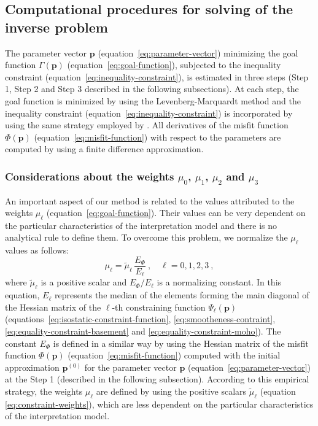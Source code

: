 \documentclass[manuscript]{geophysics}
\begin{document}
\subsection{Computational procedures for solving of the inverse problem}

The parameter vector $\mathbf{p}$ (equation~\ref{eq:parameter-vector}) minimizing the
goal function $\Gamma (\mathbf{p})$ (equation~\ref{eq:goal-function}), subjected to
the inequality constraint (equation~\ref{eq:inequality-constraint}), is estimated 
in three steps (Step 1, Step 2 and Step 3 described in the following subsections). 
At each step, the goal function is minimized by using the Levenberg-Marquardt 
method \citep{silva-etal2001, aster-etal2005} and the inequality constraint 
(equation~\ref{eq:inequality-constraint}) is incorporated by using the same strategy 
employed by \citet{barbosa-etal1999}.
All derivatives of the misfit function $\Phi(\mathbf{p})$ (equation~\ref{eq:misfit-function})
with respect to the parameters are computed by using a finite difference approximation.

\subsubsection{Considerations about the weights $\mu_{0}$, $\mu_{1}$, $\mu_{2}$ and $\mu_{3}$}

An important aspect of our method is related to the values attributed to 
the weights $\mu_{\ell}$ (equation~\ref{eq:goal-function}).
Their values can be very dependent on the particular characteristics of the 
interpretation model and there is no analytical rule to define them. 
To overcome this problem, we normalize the $\mu_{\ell}$ values as follows:
\begin{equation}
	\mu_{\ell} = \tilde{\mu}_{\ell} \, \frac{E_{\Phi}}{E_{\ell}} \: 
	, \quad \ell = 0, 1, 2, 3 \: ,
	\label{eq:constraint-weights}
\end{equation}
where $\tilde{\mu}_{\ell}$ is a positive scalar and $E_{\Phi} / E_{\ell}$
is a normalizing constant. In this equation, $E_{\ell}$ represents the median 
of the elements forming the main diagonal of the Hessian matrix of the 
$\ell$-th constraining function $\Psi_{\ell}(\mathbf{p})$ 
(equations~\ref{eq:isostatic-constraint-function}, 
\ref{eq:smootheness-contraint}, \ref{eq:equality-constraint-basement} and 
\ref{eq:equality-constraint-moho}). The constant $E_{\Phi}$ is defined in 
a similar way by using the Hessian matrix of the misfit function $\Phi(\mathbf{p})$ 
(equation~\ref{eq:misfit-function}) computed with 
the initial approximation $\mathbf{p}^{(0)}$ for the parameter vector $\mathbf{p}$ 
(equation~\ref{eq:parameter-vector}) at the Step 1 (described in the following subsection).
According to this empirical strategy, the weights $\mu_{\ell}$ are defined 
by using the positive scalars $\tilde{\mu}_{\ell}$ 
(equation \ref{eq:constraint-weights}), which are less dependent on the particular 
characteristics of the interpretation model.
\end{document}
